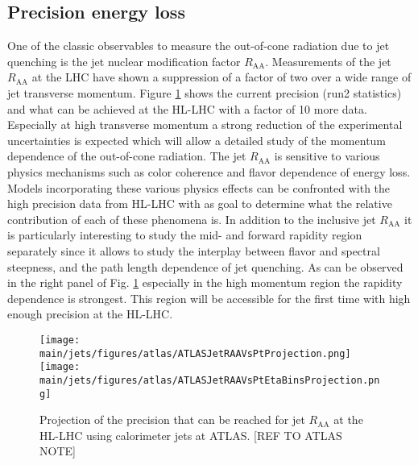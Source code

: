 \subsection{Precision energy loss}\label{sec:preceloss}
One of the classic observables to measure the out-of-cone radiation due to jet quenching is the jet nuclear modification factor $R_{\mathrm{AA}}$. Measurements of the jet $R_{\mathrm{AA}}$ at the LHC have shown a suppression of a factor of two over a wide range of jet transverse momentum. Figure \ref{fig:jetRAA} shows the current precision (run2 statistics) and what can be achieved at the HL-LHC with a factor of 10 more data. Especially at high transverse momentum a strong reduction of the experimental uncertainties is expected which will allow a detailed study of the momentum dependence of the out-of-cone radiation. The jet $R_{\mathrm{AA}}$ is sensitive to various physics mechanisms such as color coherence and flavor dependence of energy loss. Models incorporating these various physics effects can be confronted with the high precision data from HL-LHC with as goal to determine what the relative contribution of each of these phenomena is. In addition to the inclusive jet $R_{\mathrm{AA}}$ it is particularly interesting to study the mid- and forward rapidity region separately since it allows to study the interplay between flavor and spectral steepness, and the path length dependence of jet quenching. As can be observed in the right panel of Fig. \ref{fig:jetRAA} especially in the high momentum region the rapidity dependence is strongest. This region will be accessible for the first time with high enough precision at the HL-LHC.
\begin{figure}[!ht]
\begin{center}
\texttt{[image: \\main/jets/figures/atlas/ATLASJetRAAVsPtProjection.png]}
\texttt{[image: \\main/jets/figures/atlas/ATLASJetRAAVsPtEtaBinsProjection.png]}
\caption{Projection of the precision that can be reached for jet $R_{\mathrm{AA}}$ at the HL-LHC using calorimeter jets at ATLAS. [REF TO ATLAS NOTE]}
\label{fig:jetRAA}
\end{center}
\end{figure}

